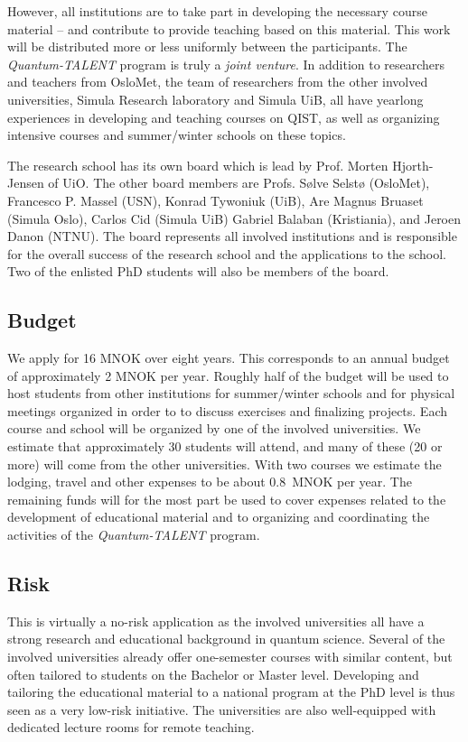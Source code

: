 \documentclass{scrreprt}
\begin{document}
However, all institutions are to take part in developing the necessary course material -- and contribute to provide teaching based on this material. This work will be distributed more or less uniformly between the participants. The \textit{Quantum-TALENT} program is truly a \textit{joint venture}.
In addition to researchers and teachers from OsloMet, the team of researchers from the other involved universities, Simula Research laboratory and Simula UiB, all have yearlong experiences in developing and teaching courses on QIST, as well as organizing intensive courses and summer/winter schools on these topics. 

The research school has its own board which is lead by Prof. Morten Hjorth-Jensen of UiO. The other board members are Profs. Sølve Selstø (OsloMet), Francesco P. Massel (USN), Konrad Tywoniuk (UiB), Are Magnus Bruaset (Simula Oslo), Carlos Cid (Simula UiB) Gabriel Balaban (Kristiania), and Jeroen Danon (NTNU). The board represents all involved institutions and is responsible for the overall success of the research school and the applications to the school. Two of the enlisted PhD students will also be members of the board.

\subsection{Budget}

We apply for 16 MNOK over eight years. This corresponds to an annual budget of approximately 2 MNOK per year. Roughly half of the budget will be used to host students from other institutions for summer/winter schools and for physical meetings organized in order to to discuss exercises and finalizing projects. Each course and school will be organized by one of the involved universities. We estimate that approximately 30 students will attend, and many of these (20 or more) will come from the other universities. With two courses we estimate the lodging, travel and other expenses to be about 0.8~MNOK per year. The remaining funds will for the most part be used to cover expenses related to the development of educational material and to organizing and coordinating the activities of the \textit{Quantum-TALENT} program.

\subsection{Risk}

This is virtually a no-risk application as the involved universities all have a
strong research and educational background in quantum science. Several
of the involved universities already offer one-semester courses with
similar content, but often tailored to students on the Bachelor or Master level. Developing and tailoring the educational material to
a national program at the PhD level is thus seen as a very low-risk
initiative. The universities are also well-equipped with dedicated lecture rooms for remote teaching.
\end{document}
